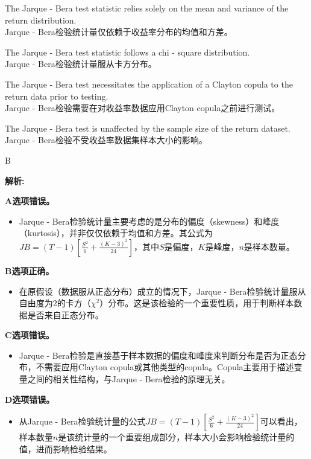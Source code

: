\documentclass{article}
\newenvironment{explanation}
{\textbf{解析:}\par}
{\par}
\begin{document}
    \begin{choices}
        \item The Jarque - Bera test statistic relies solely on the mean and variance of the return distribution.\\
        Jarque - Bera检验统计量仅依赖于收益率分布的均值和方差。
        \item The Jarque - Bera test statistic follows a chi - square distribution.\\
        Jarque - Bera检验统计量服从卡方分布。
        \item The Jarque - Bera test necessitates the application of a Clayton copula to the return data prior to testing.\\
        Jarque - Bera检验需要在对收益率数据应用Clayton copula之前进行测试。
        \item The Jarque - Bera test is unaffected by the sample size of the return dataset.\\
        Jarque - Bera检验不受收益率数据集样本大小的影响。
    \end{choices}
    
    \begin{correctanswer}
        B
    \end{correctanswer}
    
    \begin{explanation}
    \textbf{A选项错误。}
    \begin{itemize}
        \item Jarque - Bera检验统计量主要考虑的是分布的偏度（skewness）和峰度（kurtosis），并非仅仅依赖于均值和方差。其公式为\(JB = (T-1)\left[\frac{S^{2}}{6}+\frac{(K - 3)^{2}}{24}\right]\)，其中\(S\)是偏度，\(K\)是峰度，\(n\)是样本数量。
    \end{itemize}
    \textbf{B选项正确。}
    \begin{itemize}
        \item 在原假设（数据服从正态分布）成立的情况下，Jarque - Bera检验统计量服从自由度为2的卡方（\(\chi^{2}\)）分布。这是该检验的一个重要性质，用于判断样本数据是否来自正态分布。
    \end{itemize}
    \textbf{C选项错误。}
    \begin{itemize}
        \item Jarque - Bera检验是直接基于样本数据的偏度和峰度来判断分布是否为正态分布，不需要应用Clayton copula或其他类型的copula。Copula主要用于描述变量之间的相关性结构，与Jarque - Bera检验的原理无关。
    \end{itemize}
    \textbf{D选项错误。}
    \begin{itemize}
        \item 从Jarque - Bera检验统计量的公式\(JB = (T-1)\left[\frac{S^{2}}{6}+\frac{(K - 3)^{2}}{24}\right]\)可以看出，样本数量\(n\)是该统计量的一个重要组成部分，样本大小会影响检验统计量的值，进而影响检验结果。
    \end{itemize}
    \end{explanation}
    
\end{document}
